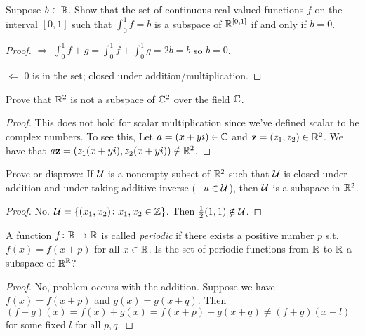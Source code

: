 \documentclass{extarticle}
\begin{document}
\begin{problem}{4}
    Suppose \(b \in \mathbb{R}\). Show that the set of continuous real-valued functions \(f\)
    on the interval \([0, 1]\) such that \(\int_0^1 f = b\) is a subspace of \(\mathbb{R}^{[0,1]}\)
    if and only if \(b = 0\). 
\end{problem}

\begin{proof}
\(\Rightarrow\) \(\int_0^1 f + g = \int_0^1 f + \int_0^1 g = 2b = b\) so \(b =0\). 

\(\Leftarrow\) 0 is in the set; closed under addition/multiplication.
\end{proof}

\begin{problem}{5}
    Prove that \(\mathbb{R}^2\) is not a subspace of \(\mathbb{C}^2\) over the field \(\mathbb{C}\). 
\end{problem}

\begin{proof}

This does not hold for scalar multiplication since we've defined scalar to be complex 
numbers. To see this, Let \(a = (x + yi) \in \mathbb{C}\) and \(\mathbf{z} = (z_1, z_2) \in \mathbb{R}^2\). We 
have that \(a\mathbf{z} = (z_1(x+yi), z_2 (x+yi)) \notin \mathbb{R}^2\). 

\end{proof}

\begin{problem}{7}
    Prove or disprove: If \(\mathcal{U}\) is a nonempty subset of \(\mathbb{R}^2\) such that \(\mathcal{U}\) is closed 
    under addition and under taking additive inverse (\(-u \in \mathcal{U}\)), then 
    \(\mathcal{U}\) is a subspace in \(\mathbb{R}^2\).
\end{problem}

\begin{proof}
No. \(\mathcal{U} = \{(x_1, x_2) \colon x_1, x_2 \in \mathbb{Z}\}\). Then \(\frac{1}{2}(1, 1) \notin \mathcal{U}\).
\end{proof}


\begin{problem}{9}
    A function \(f\colon \mathbb{R} \to \mathbb{R}\) is called \emph{periodic} if there exists a 
    positive number \(p\) s.t. \(f(x) = f(x + p)\) for all \(x \in \mathbb{R}\). Is the 
    set of periodic functions from \(\mathbb{R}\) to \(\mathbb{R}\) a subspace of \(\mathbb{R}^{\mathbb{R}}\)?
\end{problem}

\begin{proof}
No, problem occurs with the addition. Suppose we have \(f(x) = f(x + p)\) and 
\(g(x) = g(x + q)\). Then \((f + g)(x) = f(x) + g(x) = f(x + p) + g(x + q) \neq 
(f + g)(x + l)\) for some fixed \(l\) for all \(p,q\). 


\end{proof}
\end{document}
